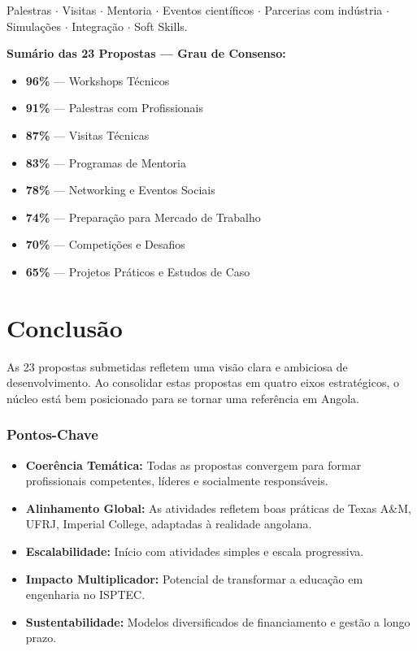 \documentclass[12pt,a4paper]{article}
\begin{document}
Palestras $\cdot$ Visitas $\cdot$ Mentoria $\cdot$ Eventos científicos $\cdot$ Parcerias com indústria $\cdot$ Simulações $\cdot$ Integração $\cdot$ Soft Skills.

\begin{goldbox}
\small\bfseries Sumário das 23 Propostas — Grau de Consenso:
\vspace{2pt}
\begin{itemize}[topsep=2pt, itemsep=2pt]
    \item \textbf{96\%} — Workshops Técnicos
    \item \textbf{91\%} — Palestras com Profissionais
    \item \textbf{87\%} — Visitas Técnicas
    \item \textbf{83\%} — Programas de Mentoria
    \item \textbf{78\%} — Networking e Eventos Sociais
    \item \textbf{74\%} — Preparação para Mercado de Trabalho
    \item \textbf{70\%} — Competições e Desafios
    \item \textbf{65\%} — Projetos Práticos e Estudos de Caso
\end{itemize}
\end{goldbox}

\newpage
\section{Conclusão}

As 23 propostas submetidas refletem uma visão clara e ambiciosa de desenvolvimento. Ao consolidar estas propostas em quatro eixos estratégicos, o núcleo está bem posicionado para se tornar uma referência em Angola.

\subsubsection*{Pontos-Chave}
\begin{itemize}
    \item \textbf{Coerência Temática:} Todas as propostas convergem para formar profissionais competentes, líderes e socialmente responsáveis.
    \item \textbf{Alinhamento Global:} As atividades refletem boas práticas de Texas A\&M, UFRJ, Imperial College, adaptadas à realidade angolana.
    \item \textbf{Escalabilidade:} Início com atividades simples e escala progressiva.
    \item \textbf{Impacto Multiplicador:} Potencial de transformar a educação em engenharia no ISPTEC.
    \item \textbf{Sustentabilidade:} Modelos diversificados de financiamento e gestão a longo prazo.
\end{itemize}
\end{document}
